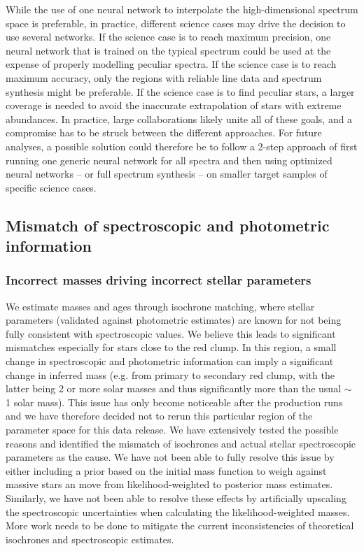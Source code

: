 \documentclass[
  journal=pasa,
  manuscript=research-paper, %
  year=2024,
  volume=37
]{cup-journal}
\begin{document}
While the use of one neural network to interpolate the high-dimensional spectrum space is preferable, in practice, different science cases may drive the decision to use several networks.
If the science case is to reach maximum precision, one neural network that is trained on the typical spectrum could be used at the expense of properly modelling peculiar spectra.
If the science case is to reach maximum accuracy, only the regions with reliable line data and spectrum synthesis might be preferable.
If the science case is to find peculiar stars, a larger coverage is needed to avoid the inaccurate extrapolation of stars with extreme abundances.
In practice, large collaborations likely unite all of these goals, and a compromise has to be struck between the different approaches.
For future analyses, a possible solution could therefore be to follow a 2-step approach of first running one generic neural network for all spectra and then using optimized neural networks -- or full spectrum synthesis -- on smaller target samples of specific science cases.

\subsection{Mismatch of spectroscopic and photometric information} \label{sec:caveats_photospec}

\subsubsection{Incorrect masses driving incorrect stellar parameters}

We estimate masses and ages through isochrone matching, where stellar parameters (validated against photometric estimates) are known for not being fully consistent with spectroscopic values.
We believe this leads to significant mismatches especially for stars close to the red clump. In this region, a small change in spectroscopic and photometric information can imply a significant change in inferred mass (e.g. from primary to secondary red clump, with the latter being 2 or more solar masses and thus significantly more than the usual $\sim$ 1 solar mass). This issue has only become noticeable after the production runs and we have therefore decided not to rerun this particular region of the parameter space for this data release. We have extensively tested the possible reasons and identified the mismatch of isochrones and actual stellar spectroscopic parameters as the cause. We have not been able to fully resolve this issue by either including a prior based on the initial mass function to weigh against massive stars \citep[see e.g.][]{Sharma2018} an move from likelihood-weighted to posterior mass estimates. Similarly, we have not been able to resolve these effects by artificially upscaling the spectroscopic uncertainties when calculating the likelihood-weighted masses. More work needs to be done to mitigate the current inconsistencies of theoretical isochrones and spectroscopic estimates.
\end{document}
